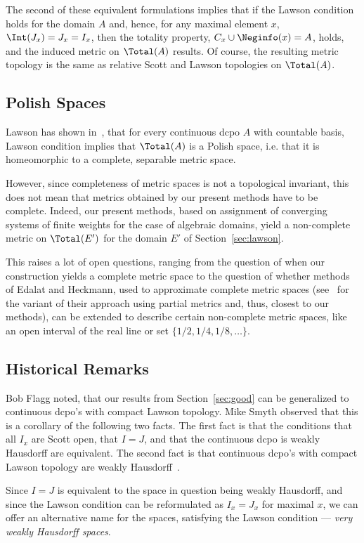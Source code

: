 The second of these equivalent formulations implies
that if the Lawson condition holds
for the domain $A$ and, hence, for any 
maximal element $x$, $\Int(J_x) = J_x = I_x$,
then the totality property,
$C_x \cup \Neginfo(x) = A$, holds, and the induced metric on $\Total(A)$
results. Of course, the resulting metric topology is the same as
relative Scott and Lawson topologies on $\Total(A)$.

\subsection{Polish Spaces}

Lawson has shown in~\cite{Lawson}, that for every continuous
dcpo $A$ with countable basis, Lawson condition implies that
$\Total(A)$ is a Polish space, i.e. that it is homeomorphic to
a complete, separable metric space.

However, since completeness of metric spaces is not a topological
invariant, this does not mean that metrics obtained by our
present methods have to be complete. Indeed, our present methods,
based on assignment of converging systems of finite weights for
the case of algebraic domains, yield a non-complete metric on
$\Total(E')$ for the domain $E'$ of Section~\ref{sec:lawson}.

This raises a lot of open questions, ranging from the question
of when our construction yields a complete metric space to
the question of whether methods of Edalat and Heckmann, used to
approximate complete metric spaces (see~\cite{Heckmann} for
the variant of their approach using partial metrics and, thus,
closest to our methods), can be extended to describe certain
non-complete metric spaces, like an open interval of the real line
or set $\{1/2, 1/4, 1/8, \ldots \}$.

\subsection{Historical Remarks}

Bob Flagg noted, that our results from Section~\ref{sec:good}
can be generalized to continuous dcpo's with compact Lawson topology.
Mike Smyth observed that this is a corollary of the following two facts.
The first fact is
that the conditions that all $I_x$ are Scott open, that $I=J$,
and that the continuous dcpo is weakly Hausdorff are equivalent.
The second fact is that continuous dcpo's with compact
Lawson topology are weakly Hausdorff~\cite{Smyth2}.

Since $I=J$ is equivalent to the space in question being weakly
Hausdorff, and since the Lawson condition can be reformulated as
$I_x = J_x$ for maximal $x$, we can offer an alternative name for
the spaces, satisfying the Lawson condition --- {\em very weakly
Hausdorff spaces}.

